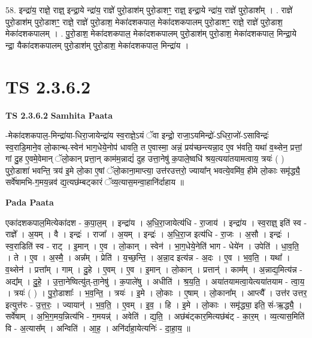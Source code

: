 \documentclass[17pt]{extarticle}
\begin{document}
58. इन्द्रा॑य॒ राज्ञे॒ राज्ञ्॒ इन्द्रा॒ये न्द्रा॑य॒ राज्ञे॑ पुरो॒डाश॑म् पुरो॒डाशꣳ॒॒ राज्ञ्॒ इन्द्रा॒ये न्द्रा॑य॒ राज्ञे॑ पुरो॒डाश᳚म् । . राज्ञे॑ पुरो॒डाश॑म् पुरो॒डाशꣳ॒॒ राज्ञे॒ राज्ञे॑ पुरो॒डाश॒ मेका॑दशकपाल॒ मेका॑दशकपालम् पुरो॒डाशꣳ॒॒ राज्ञे॒ राज्ञे॑ पुरो॒डाश॒ मेका॑दशकपालम् । . पु॒रो॒डाश॒ मेका॑दशकपाल॒ मेका॑दशकपालम् पुरो॒डाश॑म् पुरो॒डाश॒ मेका॑दशकपाल॒ मिन्द्रा॒ये न्द्रा॒ यैका॑दशकपालम् पुरो॒डाश॑म् पुरो॒डाश॒ मेका॑दशकपाल॒ मिन्द्रा॑य । \newline
\pagebreak
{}
\section*{ TS 2.3.6.2 }

\textbf{TS 2.3.6.2 } \newline
\textbf{Samhita Paata} \newline

-मेका॑दशकपाल॒-मिन्द्रा॑या-धिरा॒जायेन्द्रा॑य स्व॒राज्ञे॒ऽयं ॅवा इन्द्रो॒ राजा॒ऽयमिन्द्रो॑-ऽधिरा॒जो॑-ऽसाविन्द्रः॑ स्व॒राडि॒माने॒व लो॒कान्थ्-स्वेन॑ भाग॒धेये॒नोप॑ धावति॒ त ए॒वास्मा॒ अन्नं॒ प्रय॑च्छन्त्यन्ना॒द ए॒व भ॑वति॒ यथा॑ व॒थ्सेन॒ प्रत्तां॒ गां दु॒ह ए॒वमे॒वेमान् ॅलो॒कान् प्रत्ता॒न् काम॑म॒न्नाद्यं॑ दुह उत्ता॒नेषु॑ क॒पाले॒ष्वधि॑ श्रय॒त्यया॑तयामत्वाय॒ त्रयः॑ ( ) पुरो॒डाशा॑ भवन्ति॒ त्रय॑ इ॒मे लो॒का ए॒षां ॅलो॒काना॒माप्त्या॒ उत्त॑र‌उत्तरो॒ ज्याया᳚न् भवत्ये॒वमि॑व॒ हीमे लो॒काः समृ॑द्ध्यै॒ सर्वे॑षामभि-ग॒मय॒न्नव॑ द्य॒त्यछ॑म्बट्कारं ॅव्य॒त्यास॒मन्वा॒हानि॑र्दाहाय ॥ \newline

\textbf{Pada Paata} \newline

एका॑दशकपाल॒मित्येका॑दश - क॒पा॒ल॒म् । इन्द्रा॑य । अ॒धि॒रा॒जायेत्य॑धि - रा॒जाय॑ । इन्द्रा॑य । स्व॒राज्ञ्॒ इति॑ स्व - राज्ञे᳚ । अ॒यम् । वै । इन्द्रः॑ । राजा᳚ । अ॒यम् । इन्द्रः॑ । अ॒धि॒रा॒ज इत्य॑धि - रा॒जः । अ॒सौ । इन्द्रः॑ । स्व॒राडिति॑ स्व - राट् । इ॒मान् । ए॒व । लो॒कान् । स्वेन॑ । भा॒ग॒धेये॒नेति॑ भाग - धेये॑न । उपेति॑ । धा॒व॒ति॒ । ते । ए॒व । अ॒स्मै॒ । अन्न᳚म् । प्रेति॑ । य॒च्छ॒न्ति॒ । अ॒न्ना॒द इत्य॑न्न - अ॒दः । ए॒व । भ॒व॒ति॒ । यथा᳚ । व॒थ्सेन॑ । प्रत्ता᳚म् । गाम् । दु॒हे । ए॒वम् । ए॒व ।  इ॒मान् । लो॒कान् । प्रत्तान्॑ । काम᳚म् । अ॒न्नाद्य॒मित्य॑न्न - अद्य᳚म् । दु॒हे॒ । उ॒त्ता॒नेष्वित्यु॑त्-ता॒नेषु॑ । क॒पाले॑षु । अधीति॑ । श्र॒य॒ति॒ । अया॑तयामत्वा॒येत्यया॑तयाम - त्वा॒य॒ । त्रयः॑ ( ) । पु॒रो॒डाशाः᳚ । भ॒व॒न्ति॒ । त्रयः॑ । इ॒मे । लो॒काः । ए॒षाम् । लो॒काना᳚म् । आप्त्यै᳚ । उत्त॑र उत्तर॒ इत्युत्त॑रः - उ॒त्त॒रः॒ । ज्यायान्॑ । भ॒व॒ति॒ । ए॒वम् । इ॒व॒ । हि । इ॒मे । लो॒काः । समृ॑द्ध्या॒ इति॒ सं-ऋ॒द्ध्यै॒ ।  सर्वे॑षाम् । अ॒भि॒ग॒मय॒न्नित्य॑भि - ग॒मयन्न्॑ । अवेति॑ । द्य॒ति॒ । अछ॑बंट्कार॒मित्यछ॑बंट् - का॒र॒म् । व्य॒त्यास॒मिति॑ वि - अ॒त्यास᳚म् । अन्विति॑ । आ॒ह॒ । अनि॑र्दाहा॒येत्यनिः॑ - दा॒हा॒य॒ ॥  \newline
\end{document}
